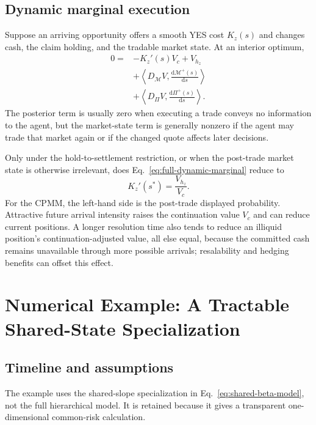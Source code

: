 \documentclass[journal,a4paper]{IEEEtran}
\begin{document}
\subsection{Dynamic marginal execution}
Suppose an arriving opportunity offers a smooth YES cost $K_z(s)$ and changes cash, the claim holding, and the tradable market state. At an interior optimum,
\begin{equation}
\begin{split}
0={}&-K_z'(s)V_c+V_{h_z}\\
&+\left\langle
D_{\mathcal{M}}V,
\frac{\mathrm{d}\mathcal{M}^{+}(s)}{\mathrm{d}s}
\right\rangle\\
&+\left\langle
D_{\Pi}V,
\frac{\mathrm{d}\Pi^{+}(s)}{\mathrm{d}s}
\right\rangle.
\end{split}
\label{eq:full-dynamic-marginal}
\end{equation}
The posterior term is usually zero when executing a trade conveys no information to the agent, but the market-state term is generally nonzero if the agent may trade that market again or if the changed quote affects later decisions.

Only under the hold-to-settlement restriction, or when the post-trade market state is otherwise irrelevant, does Eq.~\eqref{eq:full-dynamic-marginal} reduce to
\begin{equation}
K_z'(s^*)
=
\frac{V_{h_z}}{V_c}.
\label{eq:reduced-dynamic-marginal}
\end{equation}
For the CPMM, the left-hand side is the post-trade displayed probability. Attractive future arrival intensity raises the continuation value $V_c$ and can reduce current positions. A longer resolution time also tends to reduce an illiquid position's continuation-adjusted value, all else equal, because the committed cash remains unavailable through more possible arrivals; resalability and hedging benefits can offset this effect.

\section{Numerical Example: A Tractable Shared-State Specialization}
\subsection{Timeline and assumptions}
The example uses the shared-slope specialization in Eq.~\eqref{eq:shared-beta-model}, not the full hierarchical model. It is retained because it gives a transparent one-dimensional common-risk calculation.
\end{document}
